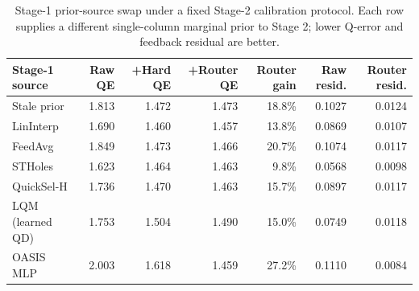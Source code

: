 \begin{table}[t]
  \centering
  \small
  \caption{Stage-1 prior-source swap under a fixed Stage-2 calibration protocol. Each row supplies a different single-column marginal prior to Stage 2; lower Q-error and feedback residual are better.}
  \label{tab:stage1_estimator_swap}
  \setlength{\tabcolsep}{4pt}
  \begin{tabular}{lrrrrrr}
    \toprule
    Stage-1 source & Raw QE & +Hard QE & +Router QE & Router gain & Raw resid. & Router resid. \\
    \midrule
    Stale prior & 1.813 & 1.472 & 1.473 & 18.8\% & 0.1027 & 0.0124 \\
    LinInterp & 1.690 & 1.460 & 1.457 & 13.8\% & 0.0869 & 0.0107 \\
    FeedAvg & 1.849 & 1.473 & 1.466 & 20.7\% & 0.1074 & 0.0117 \\
    STHoles & 1.623 & 1.464 & 1.463 & 9.8\% & 0.0568 & 0.0098 \\
    QuickSel-H & 1.736 & 1.470 & 1.463 & 15.7\% & 0.0897 & 0.0117 \\
    LQM (learned QD) & 1.753 & 1.504 & 1.490 & 15.0\% & 0.0749 & 0.0118 \\
    OASIS MLP & 2.003 & 1.618 & 1.459 & 27.2\% & 0.1110 & 0.0084 \\
    \bottomrule
  \end{tabular}
\end{table}
